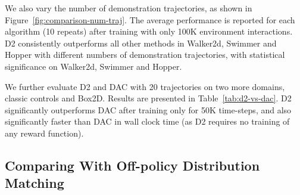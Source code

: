 \documentclass[letterpaper]{article} %
\begin{document}
We also vary the number of demonstration trajectories,
as shown in Figure~\ref{fig:comparison-num-traj}. 
The average performance is reported for each algorithm (10 repeats) after training with only 100K environment interactions. 
D2 consistently outperforms all other methods in Walker2d, Swimmer and Hopper with different numbers of demonstration trajectories,
with statistical significance on Walker2d, Swimmer and Hopper. 

We further evaluate D2 and DAC with 20 trajectories on two more domains, classic controls and Box2D. 
Results are presented in Table~\ref{tab:d2-vs-dac}. 
D2 significantly outperforms DAC after training only for 50K time-steps, and
also significantly faster than DAC in wall clock time 
(as D2 requires no training of any reward function). 

\subsection{Comparing With Off-policy Distribution Matching}\label{sec:exp-distribution-matching}
\end{document}
